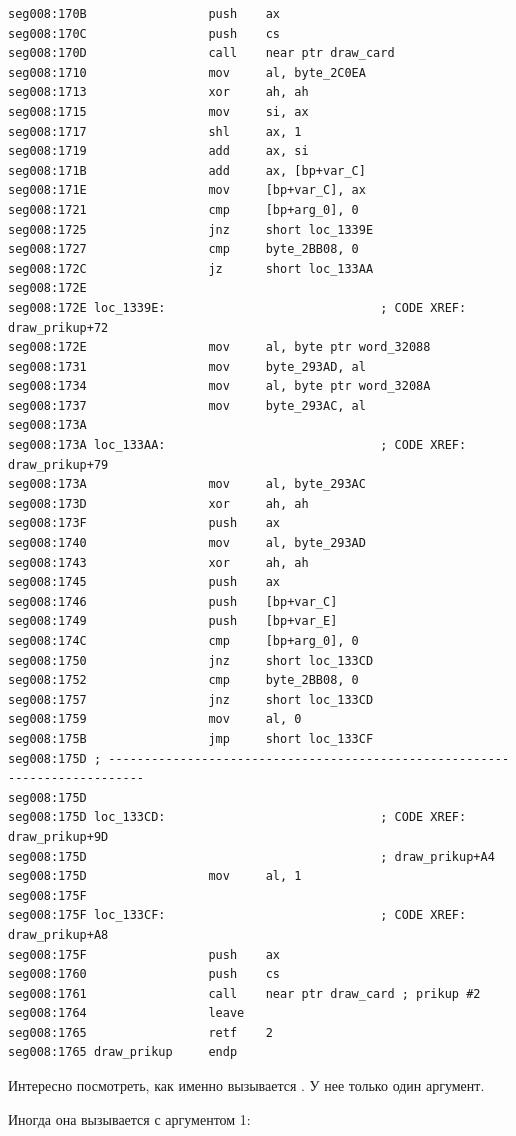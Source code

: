 \begin{lstlisting}
seg008:170B                 push    ax
seg008:170C                 push    cs
seg008:170D                 call    near ptr draw_card
seg008:1710                 mov     al, byte_2C0EA
seg008:1713                 xor     ah, ah
seg008:1715                 mov     si, ax
seg008:1717                 shl     ax, 1
seg008:1719                 add     ax, si
seg008:171B                 add     ax, [bp+var_C]
seg008:171E                 mov     [bp+var_C], ax
seg008:1721                 cmp     [bp+arg_0], 0
seg008:1725                 jnz     short loc_1339E
seg008:1727                 cmp     byte_2BB08, 0
seg008:172C                 jz      short loc_133AA
seg008:172E
seg008:172E loc_1339E:                              ; CODE XREF: draw_prikup+72
seg008:172E                 mov     al, byte ptr word_32088
seg008:1731                 mov     byte_293AD, al
seg008:1734                 mov     al, byte ptr word_3208A
seg008:1737                 mov     byte_293AC, al
seg008:173A
seg008:173A loc_133AA:                              ; CODE XREF: draw_prikup+79
seg008:173A                 mov     al, byte_293AC
seg008:173D                 xor     ah, ah
seg008:173F                 push    ax
seg008:1740                 mov     al, byte_293AD
seg008:1743                 xor     ah, ah
seg008:1745                 push    ax
seg008:1746                 push    [bp+var_C]
seg008:1749                 push    [bp+var_E]
seg008:174C                 cmp     [bp+arg_0], 0
seg008:1750                 jnz     short loc_133CD
seg008:1752                 cmp     byte_2BB08, 0
seg008:1757                 jnz     short loc_133CD
seg008:1759                 mov     al, 0
seg008:175B                 jmp     short loc_133CF
seg008:175D ; ---------------------------------------------------------------------------
seg008:175D
seg008:175D loc_133CD:                              ; CODE XREF: draw_prikup+9D
seg008:175D                                         ; draw_prikup+A4
seg008:175D                 mov     al, 1
seg008:175F
seg008:175F loc_133CF:                              ; CODE XREF: draw_prikup+A8
seg008:175F                 push    ax
seg008:1760                 push    cs
seg008:1761                 call    near ptr draw_card ; prikup #2
seg008:1764                 leave
seg008:1765                 retf    2
seg008:1765 draw_prikup     endp
\end{lstlisting}

Интересно посмотреть, как именно вызывается . У нее только один аргумент.

Иногда она вызывается с аргументом 1:

